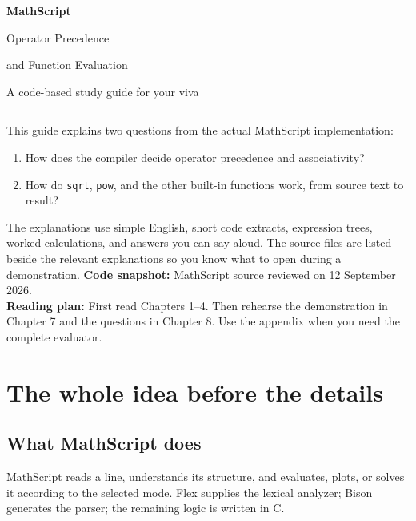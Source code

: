 \documentclass[11pt,a4paper]{report}
\begin{document}
\begin{titlepage}
\vspace*{18mm}
{\Huge\bfseries\color{ink} MathScript\par}
\vspace{5mm}
{\LARGE Operator Precedence\par and Function Evaluation\par}
\vspace{10mm}
{\Large A code-based study guide for your viva\par}
\vspace{12mm}
\hrule
\vspace{6mm}
This guide explains two questions from the actual MathScript implementation:
\begin{enumerate}
\item How does the compiler decide operator precedence and associativity?
\item How do \texttt{sqrt}, \texttt{pow}, and the other built-in functions work, from source text to result?
\end{enumerate}
The explanations use simple English, short code extracts, expression trees,
worked calculations, and answers you can say aloud. The source files are
listed beside the relevant explanations so you know what to open during a demonstration.
\vfill
\textbf{Code snapshot:} MathScript source reviewed on 12 September 2026.\\
\textbf{Reading plan:} First read Chapters 1--4. Then rehearse the demonstration
in Chapter 7 and the questions in Chapter 8. Use the appendix when you need the complete evaluator.
\end{titlepage}
\tableofcontents

\chapter{The whole idea before the details}
\section{What MathScript does}
MathScript reads a line, understands its structure, and evaluates, plots, or
solves it according to the selected mode. Flex supplies the lexical analyzer;
Bison generates the parser; the remaining logic is written in C.
\end{document}
